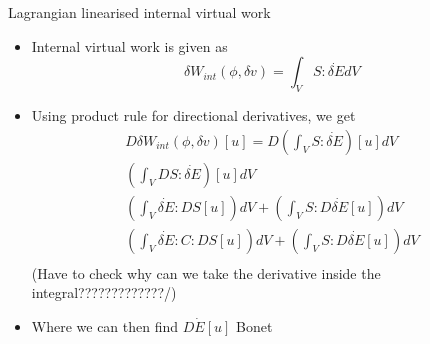 	\begin{frame}{Lagrangian linearised internal virtual work}
		\begin{itemize}
			\item Internal virtual work is given as
			\begin{equation}
				\delta W_{int}(\phi,\delta v) = \int_V S:\dot{\delta E} dV
			\end{equation}
			\item Using product rule for directional derivatives, we get 
			\begin{equation}
				\begin{aligned}
				D 	\delta W_{int}(\phi,\delta v)[u] = D\left(\int_V S:\dot{\delta E} \right)[u] dV\\ 
				\left(\int_V D S:\dot{\delta E} \right)[u] dV\\
     			 \left(\int_V \dot{\delta E} :D S[u] \right) dV + \left(\int_V  S:D \dot{\delta E}[u] \right) dV\\
     			 \left(\int_V \dot{\delta E} :C:D S[u] \right) dV + \left(\int_V  S:D \dot{\delta E}[u] \right) dV\\
				\end{aligned}
			\end{equation}
			(Have to check why can we take the derivative inside the integral?????????????/)		
			\item Where we can then find $D \dot{E}[u]$ Bonet
		\end{itemize}
	\end{frame}


